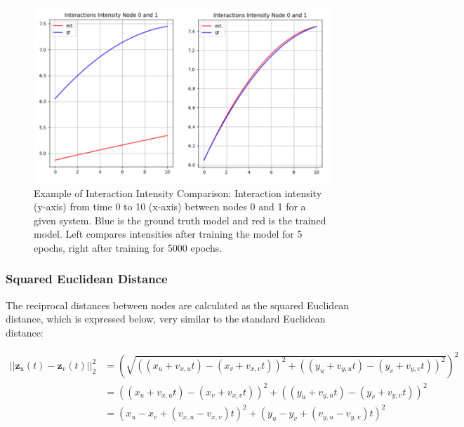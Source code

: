 \begin{figure}[H]
    \centering
    \includegraphics[width=\textwidth]{0_images/5vs5000epochs.png}
    \caption{Example of Interaction Intensity Comparison: Interaction intensity (y-axis) from time 0 to 10 (x-axis) between nodes 0 and 1 for a given system. Blue is the ground truth model and red is the trained model. Left compares intensities after training the model for 5 epochs, right after training for 5000 epochs.}
    \label{fig:5vs5000epochs}
\end{figure}






\subsubsection{Squared Euclidean Distance}
\label{sec:Method:LSM:SquaredEuclideanDistance}
The reciprocal distances between nodes are calculated as the squared Euclidean distance, which is expressed below, very similar to the standard Euclidean distance:

\begin{align} 
||\textbf{z}_u(t) - \textbf{z}_v(t)||_2^2
&= 
\left(\sqrt{((x_u + v_{x,u}t) - (x_v + v_{x,v}t))^2 + ((y_u + v_{y,u}t) - (y_v + v_{y,v}t))^2}\right)^2
\\
&=
((x_u + v_{x,u}t) - (x_v + v_{x,v}t))^2 + ((y_u + v_{y,u}t) - (y_v + v_{y,v}t))^2
\\
&=
(x_u - x_v + (v_{x,u} - v_{x,v})t)^2 + (y_u - y_v + ( v_{y,u} - v_{y,v})t)^2
\end{align}





